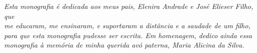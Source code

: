 \begin{dedicatoria}
   \vspace*{\fill}
   \centering
   \noindent

   \textit{Esta monografia é dedicada aos meus pais, Elenira Andrade e José Elieser Filho, que\\
   me educaram, me ensinaram, e suportaram a distância e a saudade de um filho, para que esta monografia pudesse ser escrita. Em homenagem, dedico ainda essa monografia à memória de minha querida avó paterna, Maria Alicina da Silva.} \vspace*{\fill}
\end{dedicatoria}
